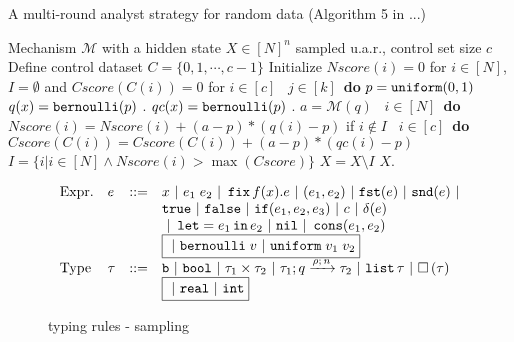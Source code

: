 \documentclass[a4paper,11pt]{article}
\theoremstyle{definition}
\begin{document}
\begin{algorithm}
\footnotesize
\caption{A multi-round analyst strategy for random data (Algorithm 5 in ...)}
\label{alg:BitGOF}
\begin{algorithmic}
\REQUIRE Mechanism $\mathcal{M}$ with a hidden state $X\in [N]^{n}$ sampled u.a.r., control set size $c$
\STATE Define control dataset $C = \{0,1, \cdots, c - 1\}$
\STATE Initialize $Nscore(i) = 0$ for $i \in [N]$, $I = \emptyset$ and $Cscore(C(i)) = 0$ for $i \in [c]$
\ $j\in [k]$\ {\bf do} 
\STATE {} $p=\mathtt{uniform}(0,1)$ 
\STATE {} $q (x) = \mathtt{bernoulli} ( p )$ .
\STATE {} $qc (x) = \mathtt{bernoulli} ( p )$ .
\STATE {} $a = \mathcal{M}(q)$ 
\STATE {}\ $i \in [N]$\ {\bf do}
\STATE \qquad \qquad $Nscore(i) = Nscore(i) + (a - p)*(q (i) - p)$ if $i \notin I$
\STATE {}\ $i \in [c]$\ {\bf do}
\STATE \qquad \qquad $Cscore(C(i)) = Cscore(C(i)) + (a - p)*(qc (i) - p)$
\STATE {} $I = \{i | i\in [N] \land Nscore(i) > \max(Cscore)\}$
\STATE {} $X = X \setminus I$
\RETURN $X$.
\end{algorithmic}
\end{algorithm}

\[\begin{array}{llll}
\mbox{Expr.} & \expr & ::= & x ~|~ \expr_1 \eapp \expr_2 ~|~ \efix f(x).\expr
 						~|~ (\expr_1, \expr_2) ~|~ \eprojl(\expr) ~|~ \eprojr(\expr) ~| \\
%
& & & 					\etrue ~|~ \efalse ~|~ \eif(\expr_1, \expr_2, \expr_3) 
						~|~ \econst ~|~ \eop(\expr) \\
& & & 					~|~ \elet  = \expr_1 \ein \expr_2 ~|~ \enil ~|~  \econs (
      					\expr_1, \expr_2)  \\
& & & \boxed{~|~ \bernoulli \eapp \valr ~|~ \uniform \eapp \valr_1 \eapp \valr_2}\\      
%
  \mbox{Type} & \type & ::= & \tbase ~|~ \tbool ~|~ \type_1 \times
  \type_2 ~|~ \tarr{\type_1}{\type_2}{\nnatbiA}{\dmap}{\nnatA} ~|~
                              \tlist{\type} ~|~ \tbox{\type}\\
& & &                  \boxed{ ~|~  \treal ~|~	\tint }                
%
\end{array}\]
\begin{figure}
  \caption{typing rules - sampling}
  \label{fig:type-rules-monad}
\end{figure}
\end{document}
